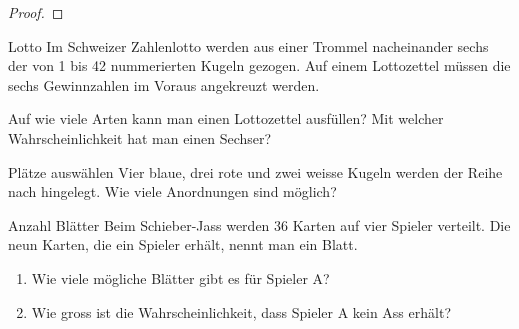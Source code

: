 \begin{proof}
    \phantom{text}

    \vspace{6cm}

\end{proof}
\begin{bsp}
    {Lotto}{}
    Im Schweizer Zahlenlotto werden aus einer Trommel nacheinander sechs der von 1 bis 42 nummerierten Kugeln gezogen. Auf einem Lottozettel müssen die sechs Gewinnzahlen im Voraus angekreuzt werden.

    Auf wie viele Arten kann man einen Lottozettel ausfüllen? Mit welcher Wahrscheinlichkeit hat man einen Sechser?

    \vspace{3cm}

\end{bsp}
\clearpage
\begin{bsp}
    {Plätze auswählen}{}
    Vier blaue, drei rote und zwei weisse Kugeln werden der Reihe nach hingelegt. Wie viele Anordnungen sind möglich?

    \vspace{5cm}

\end{bsp}
\begin{bsp}
    {Anzahl Blätter}{}
    Beim Schieber-Jass werden 36 Karten auf vier Spieler verteilt. Die neun Karten, die ein Spieler erhält, nennt man ein Blatt.
    \begin{enumerate}
        \item Wie viele mögliche Blätter gibt es für Spieler A?

              \vspace{3cm}

        \item Wie gross ist die Wahrscheinlichkeit, dass Spieler A kein Ass erhält?



    \end{enumerate}

    \vspace{4cm}



\end{bsp}
\clearpage

